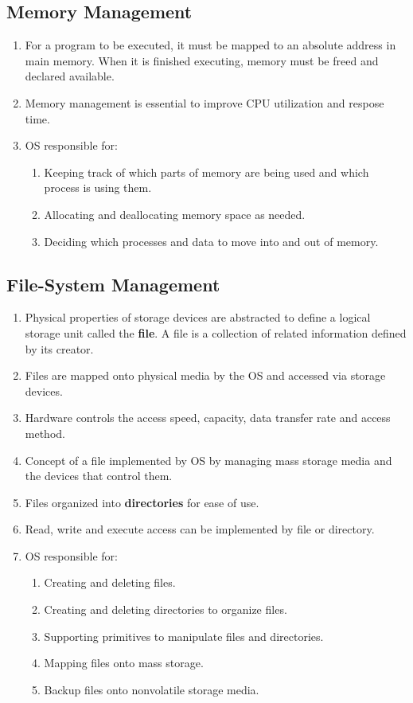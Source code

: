 \documentclass[journal,12pt,twocolumn]{IEEEtran}
\begin{document}
\subsection{Memory Management}
\begin{enumerate}
    \item For a program to be executed, it must be mapped to an absolute address 
    in main memory. When it is finished executing, memory must be freed and 
    declared available.
    \item Memory management is essential to improve CPU utilization and respose time.
    \item OS responsible for:
    \begin{enumerate}
        \item Keeping track of which parts of memory are being used and which 
        process is using them.
        \item Allocating and deallocating memory space as needed.
        \item Deciding which processes and data to move into and out of memory.
    \end{enumerate}
\end{enumerate}

\subsection{File-System Management}
\begin{enumerate}
    \item Physical properties of storage devices are abstracted to define a 
    logical storage unit called the \textbf{file}. A file is a collection of 
    related information defined by its creator.
    \item Files are mapped onto physical media by the OS and accessed via 
    storage devices.
    \item Hardware controls the access speed, capacity, data transfer rate and 
    access method.
    \item Concept of a file implemented by OS by managing mass storage media and 
    the devices that control them.
    \item Files organized into \textbf{directories} for ease of use.
    \item Read, write and execute access can be implemented by file or directory.
    \item OS responsible for:
    \begin{enumerate}
        \item Creating and deleting files.
        \item Creating and deleting directories to organize files.
        \item Supporting primitives to manipulate files and directories.
        \item Mapping files onto mass storage.
        \item Backup files onto nonvolatile storage media.
    \end{enumerate}
\end{enumerate}
\end{document}
